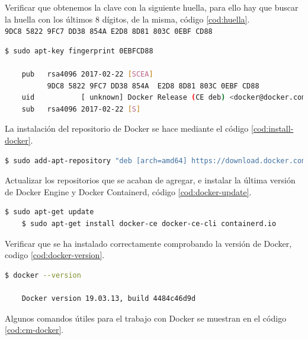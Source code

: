 Verificar que obtenemos la clave con la siguiente huella, para ello hay que buscar la huella con los últimos 8 dígitos, de la misma, código \ref{cod:huella}.\\

\texttt{9DC8 5822 9FC7 DD38 854A  E2D8 8D81 803C 0EBF CD88}\\

\begin{lstlisting}[language=Bash,caption=Instalación Docker. Parte IV, label=cod:huella, style=Consola]
	$ sudo apt-key fingerprint 0EBFCD88

	pub   rsa4096 2017-02-22 [SCEA]
		  9DC8 5822 9FC7 DD38 854A  E2D8 8D81 803C 0EBF CD88
	uid           [ unknown] Docker Release (CE deb) <docker@docker.com>
	sub   rsa4096 2017-02-22 [S]
\end{lstlisting}

La instalación del repositorio de Docker se hace mediante el código \ref{cod:install-docker}.\\ 

\begin{lstlisting}[language=Bash,caption=Instalación Docker. Parte V, label=cod:install-docker, style=Consola]
	$ sudo add-apt-repository "deb [arch=amd64] https://download.docker.com/linux/ubuntu $(lsb_release -cs) stable"
\end{lstlisting}

Actualizar los repositorios que se acaban de agregar, e instalar la última versión de Docker Engine y Docker Containerd, código \ref{cod:docker-update}.\\

\begin{lstlisting}[language=Bash,caption=Instalación Docker. Parte VI, label=cod:docker-update, style=Consola]
	$ sudo apt-get update
	$ sudo apt-get install docker-ce docker-ce-cli containerd.io
\end{lstlisting}

Verificar que se ha instalado correctamente comprobando la versión de Docker, codigo \ref{cod:docker-version}.\\

\begin{lstlisting}[language=Bash,caption=Instalación Docker. Parte VII, label=cod:docker-version, style=Consola]
	$ docker --version

	Docker version 19.03.13, build 4484c46d9d
\end{lstlisting}

Algunos comandos útiles para el trabajo con Docker se muestran en el código \ref{cod:cm-docker}.

